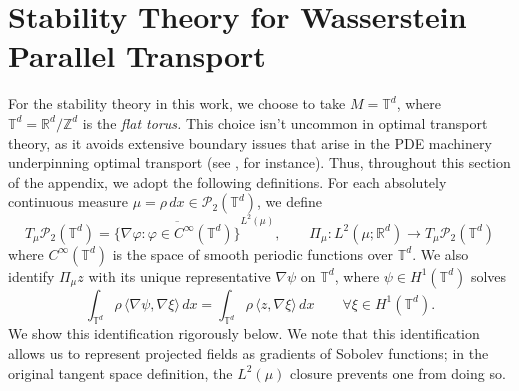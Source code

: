 \documentclass[11pt]{article}
\newcommand{\man}{M}
\begin{document}
\clearpage

{}

\appendix

\section{Stability Theory for Wasserstein Parallel Transport}

For the stability theory in this work, we choose to take $\man = \mathbb{T}^d$, where $\mathbb{T}^d = \mathbb{R}^d/\mathbb{Z}^d$ is the \textit{flat torus.} This choice isn't uncommon in optimal transport theory, as it avoids extensive boundary issues that arise in the PDE machinery underpinning optimal transport (see \citet{manole2023central}, for instance). Thus, throughout this section of the appendix, we adopt the following definitions. For each absolutely continuous measure
\(\mu=\rho\,dx\in\mathcal P_2(\mathbb T^d)\), we define
\[
T_\mu\mathcal P_2(\mathbb T^d)
=
\overline{\{\nabla\varphi:\varphi\in C^\infty(\mathbb T^d)\}}^{L^2(\mu)},
\qquad
\Pi_\mu:L^2(\mu;\mathbb R^d)\to T_\mu\mathcal P_2(\mathbb T^d)
\]
where $C^\infty(\mathbb T^d)$ is the space of smooth periodic functions over $\mathbb{T}^d$. We also identify \(\Pi_\mu z\) with its unique representative \(\nabla\psi\) on \(\mathbb{T}^d\),
where \(\psi\in H^1(\mathbb{T}^d)\) solves
\[
\int_{\mathbb{T}^d} \rho\, \langle\nabla\psi, \nabla \xi\rangle\,dx
=
\int_{\mathbb{T}^d} \rho\, \langle z, \nabla \xi\rangle\,dx
\qquad
\forall \xi\in H^1(\mathbb{T}^d).
\]
We show this identification rigorously below. We note that this identification allows us to represent projected fields as gradients of Sobolev functions; in the original tangent space definition, the $L^2(\mu)$ closure prevents one from doing so.
\end{document}
